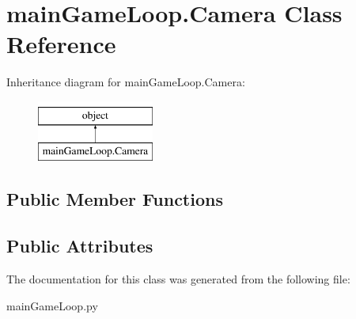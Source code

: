 \hypertarget{classmain_game_loop_1_1_camera}{}\section{main\+Game\+Loop.\+Camera Class Reference}
\label{classmain_game_loop_1_1_camera}
Inheritance diagram for main\+Game\+Loop.\+Camera\+:\begin{figure}[H]
\begin{center}
\leavevmode
\includegraphics[height=2.000000cm]{classmain_game_loop_1_1_camera}
\end{center}
\end{figure}
\subsection*{Public Member Functions}
\begin{DoxyCompactItemize}
\end{DoxyCompactItemize}
\subsection*{Public Attributes}
\begin{DoxyCompactItemize}
\end{DoxyCompactItemize}


The documentation for this class was generated from the following file\+:\begin{DoxyCompactItemize}
\item 
main\+Game\+Loop.\+py\end{DoxyCompactItemize}
